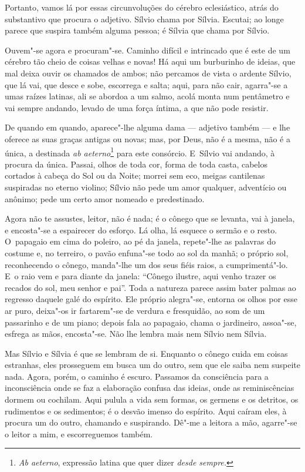 \begin{linenumbers}
Portanto, vamos lá por essas circunvoluções do cérebro eclesiástico,
atrás do substantivo que procura o adjetivo. Sílvio chama por Sílvia.
Escutai; ao longe parece que suspira também alguma pessoa; é Sílvia que
chama por Sílvio.

Ouvem"-se agora e procuram"-se. Caminho difícil e intrincado que é este de
um cérebro tão cheio de coisas velhas e novas! Há aqui um burburinho de
ideias, que mal deixa ouvir os chamados de ambos; não percamos de vista
o ardente Sílvio, que lá vai, que desce e sobe, escorrega e salta; aqui,
para não cair, agarra"-se a umas raízes latinas, ali se abordoa a um
salmo, acolá monta num pentâmetro e vai sempre andando, levado de uma
força íntima, a que não pode resistir.

De quando em quando, aparece"-lhe alguma dama --- adjetivo também --- e lhe
oferece as suas graças antigas ou novas; mas, por Deus, não é a mesma,
não é a única, a destinada \emph{ab aeterno}\footnote{\emph{Ab aeterno},
  expressão latina que quer dizer \emph{desde sempre. }} para este
consórcio. E~Sílvio vai andando, à procura da única. Passai, olhos de
toda cor, forma de toda casta, cabelos cortados à cabeça do Sol ou da
Noite; morrei sem eco, meigas cantilenas suspiradas no eterno violino;
Sílvio não pede um amor qualquer, adventício ou anônimo; pede um certo
amor nomeado e predestinado.

Agora não te assustes, leitor, não é nada; é o cônego que se levanta,
vai à janela, e encosta"-se a espairecer do esforço. Lá olha, lá esquece
o sermão e o resto. O~papagaio em cima do poleiro, ao pé da janela,
repete"-lhe as palavras do costume e, no terreiro, o pavão enfuna"-se todo
ao sol da manhã; o próprio sol, reconhecendo o cônego, manda"-lhe um dos
seus fiéis raios, a cumprimentá"-lo. E~o raio vem e para diante da
janela: ``Cônego ilustre, aqui venho trazer os recados do sol, meu
senhor e pai''. Toda a natureza parece assim bater palmas ao regresso
daquele galé do espírito. Ele próprio alegra"-se, entorna os olhos por
esse ar puro, deixa"-os ir fartarem"-se de verdura e fresquidão, ao som de
um passarinho e de um piano; depois fala ao papagaio, chama o
jardineiro, assoa"-se, esfrega as mãos, encosta"-se. Não lhe lembra mais
nem Sílvio nem Sílvia.

Mas Sílvio e Sílvia é que se lembram de si. Enquanto o cônego cuida em
coisas estranhas, eles prosseguem em busca um do outro, sem que ele
saiba nem suspeite nada. Agora, porém, o caminho é escuro. Passamos da
consciência para a inconsciência onde se faz a elaboração confusa das
ideias, onde as reminiscências dormem ou cochilam. Aqui pulula a vida
sem formas, os germens e os detritos, os rudimentos e os sedimentos; é o
desvão imenso do espírito. Aqui caíram eles, à procura um do outro,
chamando e suspirando. Dê"-me a leitora a mão, agarre"-se o leitor a mim,
e escorreguemos também.


\end{linenumbers}
